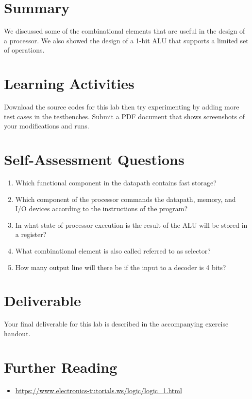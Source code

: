 \documentclass[a4paper, 11pt,oneside]{article}
\begin{document}
\section{Summary}
We discussed some of the combinational elements that are useful in the design of a processor. We also showed the design of a 1-bit ALU that supports a limited set of operations.

\section{Learning Activities}
Download the source codes for this lab then try experimenting by adding more test cases in the testbenches. Submit a PDF document that shows screenshots of your modifications and runs.

\section{Self-Assessment Questions}
\begin{enumerate}
\item Which functional component in the datapath contains fast storage?
\item Which component of the processor commands the datapath, memory, and 
I/O devices according to the instructions of the program? 
\item In what state of processor execution is the result of the ALU will be 
stored in a register?
\item What combinational element is also called referred to as selector?
\item How many output line will there be if the input to a decoder is 4 bits?
\end{enumerate}

\section{Deliverable}
Your final deliverable for this lab is described in the accompanying exercise handout.

\section{Further Reading}
\begin{itemize}
\item 
\href{https://www.electronics-tutorials.ws/logic/logic\_1.html}
{https://www.electronics-tutorials.ws/logic/logic\_1.html}
\end{itemize}




\nocite{*}
\end{document}
